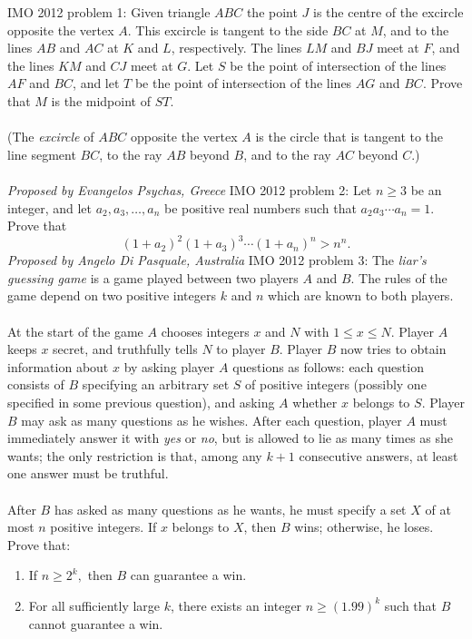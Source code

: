 IMO 2012 problem 1:  Given triangle $ABC$ the point $J$ is the centre of the excircle opposite the vertex $A.$ This excircle is tangent to the side $BC$ at $M$, and to the lines $AB$ and $AC$ at $K$ and $L$, respectively. The lines $LM$ and $BJ$ meet at $F$, and the lines $KM$ and $CJ$ meet at $G.$ Let $S$ be the point of intersection of the lines $AF$ and $BC$, and let $T$ be the point of intersection of the lines $AG$ and $BC.$ Prove that $M$ is the midpoint of $ST.$ \\\\
(The \textit{excircle} of $ABC$ opposite the vertex $A$ is the circle that is tangent to the line segment $BC$, to the ray $AB$ beyond $B$, and to the ray $AC$ beyond $C$.) \\\\
\textit{Proposed by Evangelos Psychas, Greece} 
IMO 2012 problem 2:  Let $n\ge 3$ be an integer, and let $a_2,a_3,\ldots ,a_n$ be positive real numbers such that $a_2a_3\cdots a_n=1$. Prove that
\[ (1 + a_2)^2 (1 + a_3)^3 \dotsm (1 + a_n)^n > n^n. \]
\textit{Proposed by Angelo Di Pasquale, Australia} 
IMO 2012 problem 3:  The \textit{liar's guessing game} is a game played between two players $A$ and $B$. The rules of the game depend on two positive integers $k$ and $n$ which are known to both players. \\\\
At the start of the game $A$ chooses integers $x$ and $N$ with $1 \le x \le N.$ Player $A$ keeps $x$ secret, and truthfully tells $N$ to player $B$. Player $B$ now tries to obtain information about $x$ by asking player $A$ questions as follows: each question consists of $B$ specifying an arbitrary set $S$ of positive integers (possibly one specified in some previous question), and asking $A$ whether $x$ belongs to $S$. Player $B$ may ask as many questions as he wishes. After each question, player $A$ must immediately answer it with \textit{yes} or \textit{no}, but is allowed to lie as many times as she wants; the only restriction is that, among any $k+1$ consecutive answers, at least one answer must be truthful. \\\\
After $B$ has asked as many questions as he wants, he must specify a set $X$ of at most $n$ positive integers. If $x$ belongs to $X$, then $B$ wins; otherwise, he loses. Prove that:
\begin{enumerate}
  \item If $n \ge 2^k,$ then $B$ can guarantee a win.
  \item For all sufficiently large $k$, there exists an integer $n \ge (1.99)^k$ such that $B$ cannot guarantee a win.
\end{enumerate}

